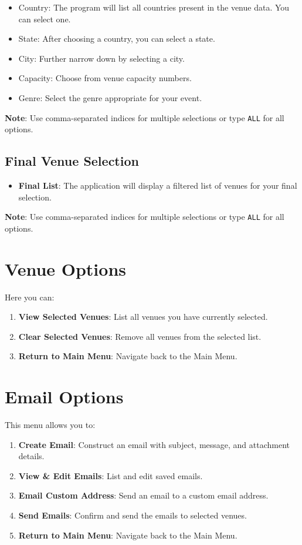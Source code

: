 \documentclass{article}
\begin{document}
\begin{itemize}
	\item Country: The program will list all countries present in the venue data. You can select one.
	\item State: After choosing a country, you can select a state.
	\item City: Further narrow down by selecting a city.
	\item Capacity: Choose from venue capacity numbers.
	\item Genre: Select the genre appropriate for your event.
\end{itemize}

\textbf{Note}: Use comma-separated indices for multiple selections or type \texttt{ALL} for all options.

\subsection{Final Venue Selection}

\begin{itemize}
	\item \textbf{Final List}: The application will display a filtered list of venues for your final selection.
\end{itemize}

\textbf{Note}: Use comma-separated indices for multiple selections or type \texttt{ALL} for all options.

\section{Venue Options}

Here you can:

\begin{enumerate}
	\item \textbf{View Selected Venues}: List all venues you have currently selected.
	\item \textbf{Clear Selected Venues}: Remove all venues from the selected list.
	\item \textbf{Return to Main Menu}: Navigate back to the Main Menu.
\end{enumerate}

\section{Email Options}

This menu allows you to:

\begin{enumerate}
	\item \textbf{Create Email}: Construct an email with subject, message, and attachment details.
	\item \textbf{View \& Edit Emails}: List and edit saved emails.
	\item \textbf{Email Custom Address}: Send an email to a custom email address.
	\item \textbf{Send Emails}: Confirm and send the emails to selected venues.
	\item \textbf{Return to Main Menu}: Navigate back to the Main Menu.
\end{enumerate}
\end{document}
